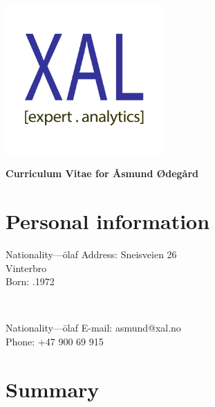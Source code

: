 \documentclass[english,a4paper,11pt]{article}
\begin{document}
\pagestyle{fancy}
\vspace*{-2cm}
\hspace*{10cm}\includegraphics[width=6cm]{logo.pdf}
\vspace*{1cm}

\noindent
{\LARGE \bfseries \color{xaldark}Curriculum Vitae for Åsmund Ødegård}

\Needspace{\cvneedspaceconst\baselineskip}
\section*{Personal information}
\begin{minipage}[t]{0.4\textwidth}
\begin{tabbing}Nationality---\=olaf\kill
Address: \> Sneisveien 26 \\
 Vinterbro \\
Born: .1972 \\
\end{tabbing}
\end{minipage}
$\quad\quad$
\begin{minipage}[t]{0.3\textwidth}
\begin{tabbing}Nationality---\=olaf\kill
E-mail: \>asmund@xal.no \\
Phone: \>+47 900 69 915 \\

\end{tabbing}
\end{minipage}


\section*{Summary}
\end{document}
